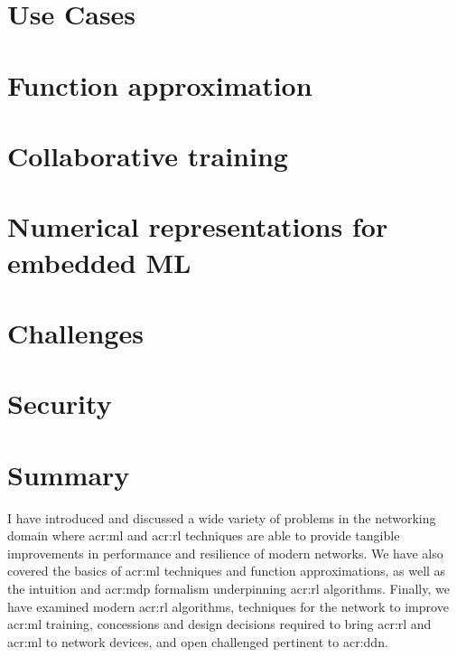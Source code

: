 \section{Use Cases}\label{sec:use-cases}%


\section{Function approximation}\label{sec:function-approximation}


\section{Collaborative training}\label{sec:ddn-collaborative-training}


\section{Numerical representations for embedded ML}\label{sec:numerical-representations-for-embedded-ml}


\section{Challenges}\label{sec:ddn-challenges}


\section{Security}\label{sec:ddn-security}


\section{Summary}
I have introduced and discussed a wide variety of problems in the networking domain where \gls{acr:ml} and \gls{acr:rl} techniques are able to provide tangible improvements in performance and resilience of modern networks.
We have also covered the basics of \gls{acr:ml} techniques and function approximations, as well as the intuition and \gls{acr:mdp} formalism underpinning \gls{acr:rl} algorithms.
Finally, we have examined modern \gls{acr:rl} algorithms, techniques for the network to improve \gls{acr:ml} training, concessions and design decisions required to bring \gls{acr:rl} and \gls{acr:ml} to network devices, and open challenged pertinent to \gls{acr:ddn}.

